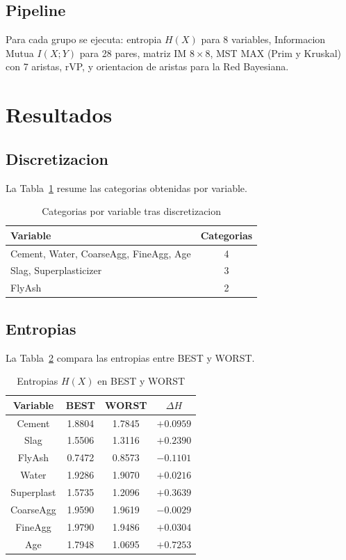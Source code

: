 \documentclass[12pt, a4paper]{article}
\begin{document}
\subsection{Pipeline}

Para cada grupo se ejecuta: entropia $H(X)$ para 8 variables, Informacion
Mutua $I(X;Y)$ para 28 pares, matriz IM $8 \times 8$, MST MAX (Prim y
Kruskal) con 7 aristas, rVP, y orientacion de aristas para la Red Bayesiana.

\section{Resultados}

\subsection{Discretizacion}

La Tabla~\ref{tab:disc} resume las categorias obtenidas por variable.

\begin{table}[H]
    \centering
    \caption{Categorias por variable tras discretizacion}
    \label{tab:disc}
    \begin{tabular}{lc}
    \toprule
    Variable & Categorias \\
    \midrule
    Cement, Water, CoarseAgg, FineAgg, Age & 4 \\
    Slag, Superplasticizer & 3 \\
    FlyAsh & 2 \\
    \bottomrule
    \end{tabular}
\end{table}

\subsection{Entropias}

La Tabla~\ref{tab:entropy} compara las entropias entre BEST y WORST.

\begin{table}[H]
    \centering
    \caption{Entropias $H(X)$ en BEST y WORST}
    \label{tab:entropy}
    \small
    \begin{tabular}{cccc}
    \toprule
    Variable & BEST & WORST & $\Delta H$ \\
    \midrule
    Cement     & 1.8804 & 1.7845 & $+0.0959$ \\
    Slag       & 1.5506 & 1.3116 & $+0.2390$ \\
    FlyAsh     & 0.7472 & 0.8573 & $-0.1101$ \\
    Water      & 1.9286 & 1.9070 & $+0.0216$ \\
    Superplast & 1.5735 & 1.2096 & $+0.3639$ \\
    CoarseAgg  & 1.9590 & 1.9619 & $-0.0029$ \\
    FineAgg    & 1.9790 & 1.9486 & $+0.0304$ \\
    Age        & 1.7948 & 1.0695 & $\mathbf{+0.7253}$ \\
    \bottomrule
    \end{tabular}
\end{table}
\end{document}
